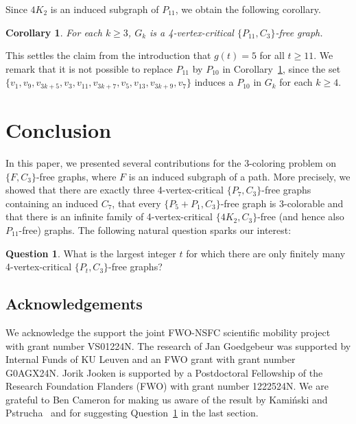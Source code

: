 \documentclass[11pt,a4paper]{article}
\newtheorem{corollary}[theorem]{Corollary}
\theoremstyle{definition}
\newtheorem{question}{Question}
\begin{document}
Since $4K_2$ is an induced subgraph of $P_{11}$, we obtain the following corollary.

\begin{corollary}\label{cor:P11}
    For each $k\geq 3$, $G_k$ is a 4-vertex-critical $\{P_{11},C_3\}$-free graph. 
\end{corollary}

This settles the claim from the introduction that $g(t)=5$ for all $t \geq 11$. We remark that it is not possible to replace $P_{11}$ by $P_{10}$ in Corollary~\ref{cor:P11}, since the set $\{v_{1}, v_{9}, v_{3k+5}, v_3, v_{11}, v_{3k+7}, v_5, v_{13}, v_{3k+9}, v_7\}$ induces a $P_{10}$ in $G_k$ for each $k \geq 4$.





    \section{Conclusion}
In this paper, we presented several contributions for the $3$-coloring problem on $\{F,C_3\}$-free graphs, where $F$ is an induced subgraph of a path. More precisely, we showed that there are exactly three 4-vertex-critical $\{P_7,C_3\}$-free graphs containing an induced $C_7$, that every $\{P_5+P_1,C_3\}$-free graph is $3$-colorable and that there is an infinite family of 4-vertex-critical $\{4K_2,C_3\}$-free (and hence also $P_{11}$-free) graphs. The following natural question sparks our interest:
\begin{question}
\label{ques}
What is the largest integer $t$ for which there are only finitely many 4-vertex-critical $\{P_t,C_3\}$-free graphs?
\end{question}

\subsection*{Acknowledgements}

\noindent  
We acknowledge the support the joint FWO-NSFC
scientific mobility project with grant number VS01224N. The research of Jan Goedgebeur was supported by Internal Funds of KU Leuven and an FWO grant with grant number G0AGX24N. Jorik Jooken is supported by a Postdoctoral Fellowship of the Research Foundation Flanders (FWO) with grant number 1222524N. We are grateful to Ben Cameron for making us aware of the result by Kami\'{n}ski and Pstrucha~\cite{KP19} and for suggesting Question~\ref{ques} in the last section.
\end{document}
